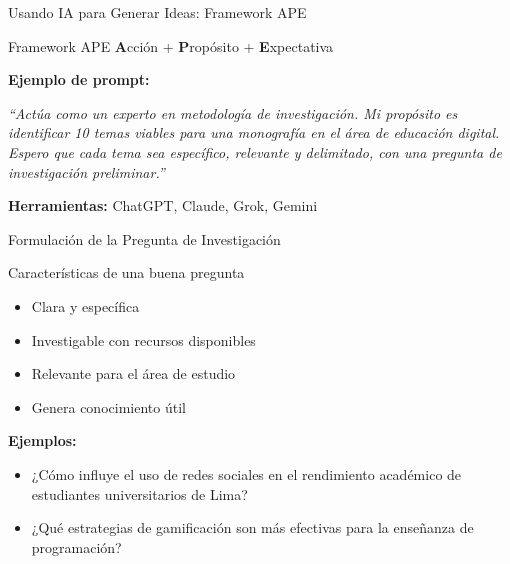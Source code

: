 \documentclass[xcolor=table,aspectratio=169,11pt]{beamer}
\begin{document}
	\begin{frame}{Usando IA para Generar Ideas: Framework APE}
		\begin{block}{Framework APE}
			\textbf{A}cción + \textbf{P}ropósito + \textbf{E}xpectativa
		\end{block}
		
		\textbf{Ejemplo de prompt:}
		
		\small
		\textit{``Actúa como un experto en metodología de investigación. Mi propósito es identificar 10 temas viables para una monografía en el área de educación digital. Espero que cada tema sea específico, relevante y delimitado, con una pregunta de investigación preliminar.''}
		
		\vspace{0.3cm}
		\textbf{Herramientas:} ChatGPT, Claude, Grok, Gemini
	\end{frame}
	
	\begin{frame}{Formulación de la Pregunta de Investigación}
		\begin{block}{Características de una buena pregunta}
			\begin{itemize}
				\item Clara y específica
				\item Investigable con recursos disponibles
				\item Relevante para el área de estudio
				\item Genera conocimiento útil
			\end{itemize}
		\end{block}
		
		\vspace{0.3cm}
		\textbf{Ejemplos:}
		\begin{itemize}
			\item ¿Cómo influye el uso de redes sociales en el rendimiento académico de estudiantes universitarios de Lima?
			\item ¿Qué estrategias de gamificación son más efectivas para la enseñanza de programación?
		\end{itemize}
	\end{frame}
	
\end{document}
